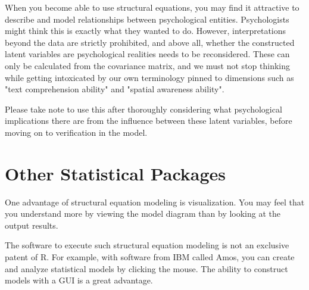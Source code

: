 \documentclass{ltjsbook}
\begin{document}
When you become able to use structural equations, you may find it attractive to describe and model relationships between psychological entities. Psychologists might think this is exactly what they wanted to do. However, interpretations beyond the data are strictly prohibited, and above all, whether the constructed latent variables are psychological realities needs to be reconsidered. These can only be calculated from the covariance matrix, and we must not stop thinking while getting intoxicated by our own terminology pinned to dimensions such as "text comprehension ability" and "spatial awareness ability".

Please take note to use this after thoroughly considering what psychological implications there are from the influence between these latent variables, before moving on to verification in the model.

\section{Other Statistical Packages}

One advantage of structural equation modeling is visualization. You may feel that you understand more by viewing the model diagram than by looking at the output results.


The software to execute such structural equation modeling is not an exclusive patent of R.
For example, with software from IBM called Amos, you can create and analyze statistical models by clicking the mouse. The ability to construct models with a GUI is a great advantage.
\end{document}
